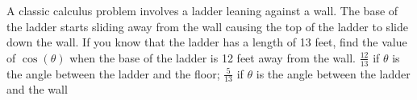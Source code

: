 {A classic calculus problem involves a ladder leaning against a wall. The base of the ladder starts sliding away from the wall causing the top of the ladder to slide down the wall. If you know that the ladder has a length of 13 feet, find the value of $\cos{(\theta)}$ when the base of the ladder is 12 feet away from the wall.}
{$\frac{12}{13}$ if $\theta$ is the angle between the ladder and the floor; $\frac{5}{13}$ if $\theta$ is the angle between the ladder and the wall}
